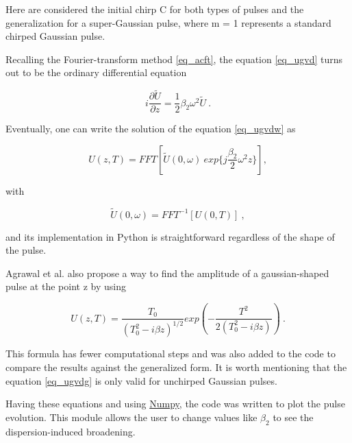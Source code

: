          Here are considered the initial chirp C for both types of pulses and the generalization for a super-Gaussian pulse, where m = 1 represents a standard chirped Gaussian pulse.
        
        
        Recalling the Fourier-transform method \eqref{eq_acft}, the equation \eqref{eq_ugvd} turns out to be the ordinary differential equation
        
        \begin{equation}\label{eq_ugvdw}
            i\frac{\partial\tilde{U}}{\partial z} = \frac{1}{2} \beta_2 \omega^2 \tilde{U} \ .
        \end{equation}
        
        Eventually, one can write the solution of the equation \eqref{eq_ugvdw} as
        
        \begin{equation}\label{eq_gvdufft}
            U(z,T) = FFT \left[ \tilde{U}(0,\omega) \ exp\{j\frac{\beta_2}{2}\omega^2z\} \right], 
        \end{equation}
        
        with
        
        \begin{equation}\label{eq_uw0gvd}
            \tilde{U}(0,\omega)  = FFT^{-1} \left[ U(0,T)\right] \ , 
        \end{equation}
        
        
        and its implementation in Python is straightforward regardless of the shape of the pulse.
        
        
        Agrawal et al. \citep{AgrawalBook} also propose a way to find the amplitude of a gaussian-shaped pulse at the point z by using 
        
        \begin{equation}\label{eq_ugvdg}
            U(z,T) = \frac{T_0}{(T^2_0 - i \beta z)^{1/2}} exp \left( -\frac{T^2}{2(T^2_0 - i \beta z)} \right) \ .
        \end{equation}
        
        This formula has fewer computational steps and was also added to the code to compare the results against the generalized form.  It is worth mentioning that the equation \eqref{eq_ugvdg} is only valid for unchirped  Gaussian pulses.
             
        Having these equations and using \href{https://numpy.org/}{Numpy}, the code was written to plot the pulse evolution. This module allows the user to change values like $\beta_2$ to see the dispersion-induced broadening. 
        
